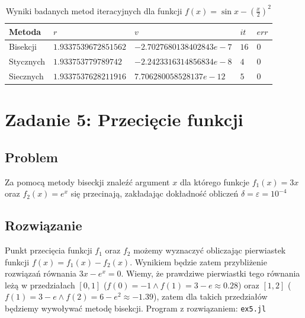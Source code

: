 \documentclass[11pt]{article}
\begin{document}
        \begin{table}[h!]
        \centering
        \begin{tabularx}{0.7\textwidth}{l l l l l }
            \hline
            Metoda & $r$ & $v$ & $it$ & $err$ \\
            \hline
            Bisekcji & $1.9337539672851562$ & $-2.7027680138402843e-7$ & $16$ & $0$ \\
            Stycznych & $1.933753779789742$ & $-2.2423316314856834e-8$ & $4$ & $0$ \\
            Siecznych & $1.9337537628211916$ & $7.706280058528137e-12$ & $5$ & $0$ \\
            \hline
        \end{tabularx}
        \label{table:ex4}
        \caption{Wyniki badanych metod iteracyjnych dla funkcji $f(x) = \sin{x} - (\frac{x}{2})^2$}
        \end{table}

\section*{Zadanie 5: Przecięcie funkcji}
    \subsection*{Problem}
        Za pomocą metody biseckji znaleźć argument $x$ dla którego funkcje $f_1(x) = 3x$ oraz 
        $f_2(x) = e^x$ się przecinają, zakładając dokładność obliczeń $\delta = \varepsilon = 10^{-4}$

    \subsection*{Rozwiązanie}
        Punkt przecięcia funkcji $f_1$ oraz $f_2$ możemy wyznaczyć obliczając pierwiastek funkcji
        $f(x) = f_1(x) - f_2(x)$.
        \newline
        Wynikiem będzie zatem przybliżenie rozwiązań równania $3x - e^x = 0$. 
        Wiemy, że prawdziwe pierwiastki tego równania leżą w przedziałach $[0, 1]$ ($f(0) = -1 \land f(1) = 3 - e \approx 0.28$) 
        oraz $[1, 2]$ ($f(1) = 3 - e \land f(2) = 6 - e^2 \approx -1.39$),
        zatem dla takich przedziałów będziemy wywoływać metodę bisekcji.
        \newline\newline
        Program z rozwiązaniem: \texttt{ex5.jl}
        
\end{document}
